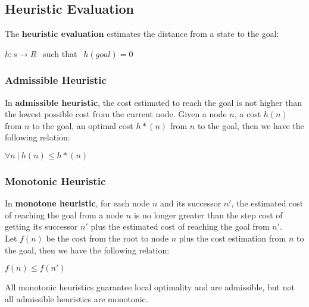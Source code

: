 \documentclass{article}
\begin{document}
\subsection{Heuristic Evaluation}
The \textbf{heuristic evaluation} estimates the distance from a state to the goal:
\begin{center}
    $h : s \rightarrow R \ \ $ such that $\ \ h(goal) = 0$
\end{center}
\subsubsection{Admissible Heuristic}
In \textbf{admissible heuristic}, the cost estimated to reach the goal is not higher than the lowest possible cost from the current node. Given a node $n$, a cost $h(n)$ from $n$ to the goal, an optimal cost $h*(n)$ from $n$ to the goal, then we have the following relation: 
\begin{center}
    $\forall n \ | \ h(n) \leq h*(n)$
\end{center}
\subsubsection{Monotonic Heuristic}
In \textbf{monotone heuristic}, for each node $n$ and its successor $n'$, the estimated cost of reaching the goal from a node $n$ is no longer greater than the step cost of getting its successor $n'$ plus the estimated cost of reaching the goal from $n'$. \\
Let $f(n)$ be the cost from the root to node $n$ plus the cost estimation from $n$ to the goal, then we have the following relation:
\begin{center}
    $f(n) \leq f(n')$
\end{center}
All monotonic heuristics guarantee local optimality and are admissible, but not all admissible heuristics are monotonic.
\newpage
\end{document}

